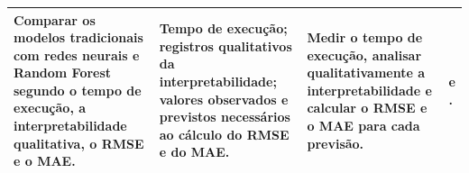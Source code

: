 \begin{table}[H]
{\begin{tabular}{p{4cm} p{5.0cm} p{3.5cm} p{4.6cm}}
			\hline
			Comparar os modelos tradicionais com redes neurais e Random Forest segundo o tempo de execução, a interpretabilidade qualitativa, o RMSE e o MAE. & Tempo de execução; registros qualitativos da interpretabilidade; valores observados e previstos necessários ao cálculo do RMSE e do MAE. & Medir o tempo de execução, analisar qualitativamente a interpretabilidade e calcular o RMSE e o MAE para cada previsão. & \citeonline{rebelo2022interpretabilidade} e \citeonline{kava2022alem}.\\
			\hline 
		\end{tabular}
	}
\end{table}
